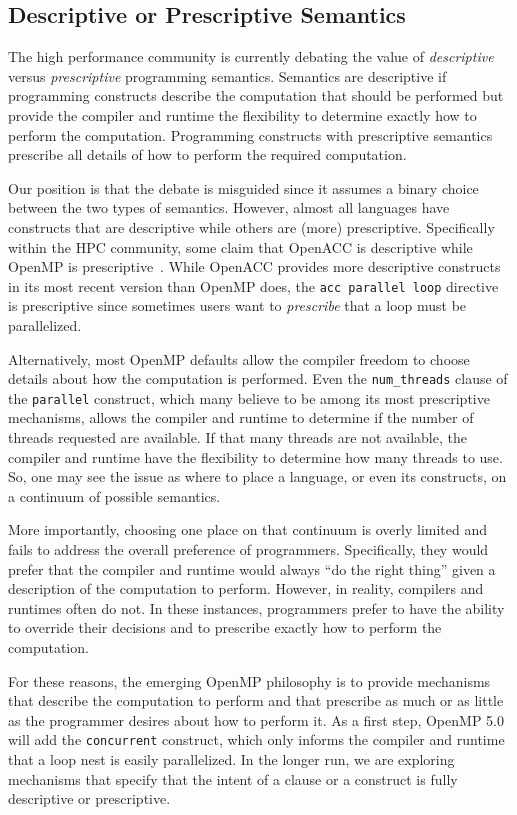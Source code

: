 \subsection{Descriptive or Prescriptive Semantics}
\label{sub:descriptive}

The high performance community is currently debating the value of 
\emph{descriptive} versus \emph{prescriptive} programming semantics. 
Semantics are descriptive if programming constructs describe the 
computation that should be performed but provide the compiler and 
runtime the flexibility to determine exactly how to perform the 
computation. Programming constructs with prescriptive semantics 
prescribe all details of how to perform the required computation.

Our position is that the debate is misguided since it assumes a binary 
choice between the two types of semantics. However, almost all languages 
have constructs that are descriptive while others are (more) prescriptive. 
Specifically within the HPC community, some claim that OpenACC is descriptive 
while OpenMP is prescriptive~\cite{juckeland2016isc,wolfe16descriptive}. 
While OpenACC provides more descriptive constructs in its most recent version 
than OpenMP does, the \texttt{acc parallel loop} directive is prescriptive 
since sometimes users want to \emph{prescribe} that a loop must be parallelized. 

Alternatively, most OpenMP defaults allow the compiler freedom
to choose details about how the computation is performed. Even
the \texttt{num\_threads} clause of the \texttt{parallel} construct,
which many believe to be among its most prescriptive mechanisms,
allows the compiler and runtime to determine if the number of
threads requested are available. If that many threads are not
available, the compiler and runtime have the flexibility to
determine how many threads to use. So, one may see the issue 
as where to place a language, or even its constructs, on a 
continuum of possible semantics.

More importantly, choosing one place on that continuum is overly
limited and fails to address the overall preference of programmers. 
Specifically, they would prefer that the compiler and runtime would 
always ``do the right thing'' given a description of the computation 
to perform. However, in reality, compilers and runtimes often do not. 
In these instances, programmers prefer to have the ability to override 
their decisions and to prescribe exactly how to perform the computation.

For these reasons, the emerging OpenMP philosophy is to provide
mechanisms that describe the computation to perform and that
prescribe as much or as little as the programmer desires about
how to perform it. As a first step, OpenMP 5.0 will add the 
\texttt{concurrent} construct, which only informs the compiler 
and runtime that a loop nest is easily parallelized. In the 
longer run, we are exploring mechanisms that specify that the 
intent of a clause or a construct is fully descriptive or prescriptive.
